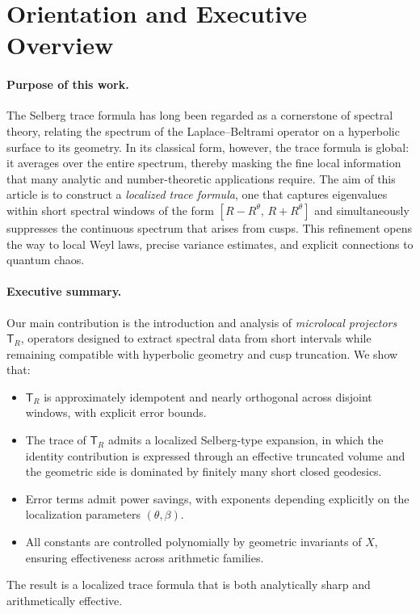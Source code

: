 \section*{Orientation and Executive Overview}\label{sec:orientation}

\paragraph{Purpose of this work.}
The Selberg trace formula has long been regarded as a cornerstone of spectral theory,
relating the spectrum of the Laplace--Beltrami operator on a hyperbolic surface to its
geometry. In its classical form, however, the trace formula is global: it averages over the
entire spectrum, thereby masking the fine local information that many analytic and
number-theoretic applications require.  
The aim of this article is to construct a \emph{localized trace formula}, one that
captures eigenvalues within short spectral windows of the form $[R-R^\theta,\,R+R^\theta]$
and simultaneously suppresses the continuous spectrum that arises from cusps.  
This refinement opens the way to local Weyl laws, precise variance estimates, and explicit
connections to quantum chaos.

\paragraph{Executive summary.}
Our main contribution is the introduction and analysis of \emph{microlocal projectors}
$\mathsf{T}_R$, operators designed to extract spectral data from short intervals while
remaining compatible with hyperbolic geometry and cusp truncation.  
We show that:
\begin{itemize}
  \item $\mathsf{T}_R$ is approximately idempotent and nearly orthogonal across disjoint
        windows, with explicit error bounds.
  \item The trace of $\mathsf{T}_R$ admits a localized Selberg-type expansion, in which
        the identity contribution is expressed through an effective truncated volume and
        the geometric side is dominated by finitely many short closed geodesics.
  \item Error terms admit power savings, with exponents depending explicitly on the
        localization parameters $(\theta,\beta)$.
  \item All constants are controlled polynomially by geometric invariants of $X$, ensuring
        effectiveness across arithmetic families.
\end{itemize}
The result is a localized trace formula that is both analytically sharp and
arithmetically effective.

